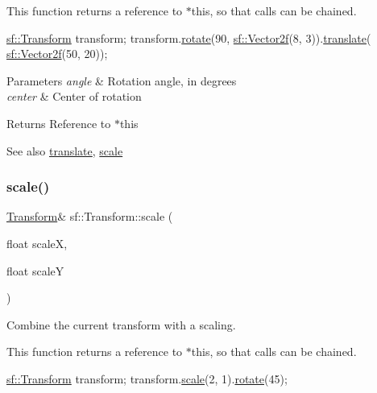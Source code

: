 This function returns a reference to $\ast$this, so that calls can be chained. 
\begin{DoxyCode}
\hyperlink{classsf_1_1_transform}{sf::Transform} transform;
transform.\hyperlink{classsf_1_1_transform_a3e548c3c9e3fb9d4bd43cf852669e555}{rotate}(90, \hyperlink{classsf_1_1_vector2}{sf::Vector2f}(8, 3)).\hyperlink{classsf_1_1_transform_ab54f6c8070cc05e2afcb3145fbf4395a}{translate}(
      \hyperlink{classsf_1_1_vector2}{sf::Vector2f}(50, 20));
\end{DoxyCode}



\begin{DoxyParams}{Parameters}
{\em angle} & Rotation angle, in degrees \\
\hline
{\em center} & Center of rotation\\
\hline
\end{DoxyParams}
\begin{DoxyReturn}{Returns}
Reference to $\ast$this
\end{DoxyReturn}
\begin{DoxySeeAlso}{See also}
\hyperlink{classsf_1_1_transform_ab54f6c8070cc05e2afcb3145fbf4395a}{translate}, \hyperlink{classsf_1_1_transform_a3f46af807f69d74120fb836334268671}{scale} 
\end{DoxySeeAlso}
\mbox{\label{classsf_1_1_transform_a3f46af807f69d74120fb836334268671}} 
\subsubsection{\texorpdfstring{scale()}{scale()}\hspace{0.1cm}{\footnotesize\ttfamily [1/4]}}
{\footnotesize\ttfamily \hyperlink{classsf_1_1_transform}{Transform}\& sf\+::\+Transform\+::scale (\begin{DoxyParamCaption}\item[{float}]{scaleX,  }\item[{float}]{scaleY }\end{DoxyParamCaption})}



Combine the current transform with a scaling. 

This function returns a reference to $\ast$this, so that calls can be chained. 
\begin{DoxyCode}
\hyperlink{classsf_1_1_transform}{sf::Transform} transform;
transform.\hyperlink{classsf_1_1_transform_a3f46af807f69d74120fb836334268671}{scale}(2, 1).\hyperlink{classsf_1_1_transform_a3e548c3c9e3fb9d4bd43cf852669e555}{rotate}(45);
\end{DoxyCode}



